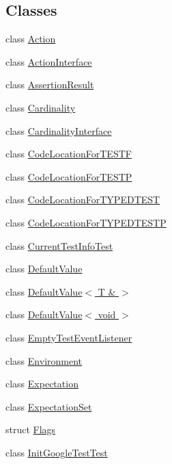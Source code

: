 \subsection*{Classes}
\begin{DoxyCompactItemize}
\item 
class \hyperlink{classtesting_1_1_action}{Action}
\item 
class \hyperlink{classtesting_1_1_action_interface}{Action\+Interface}
\item 
class \hyperlink{classtesting_1_1_assertion_result}{Assertion\+Result}
\item 
class \hyperlink{classtesting_1_1_cardinality}{Cardinality}
\item 
class \hyperlink{classtesting_1_1_cardinality_interface}{Cardinality\+Interface}
\item 
class \hyperlink{classtesting_1_1_code_location_for_t_e_s_t_f}{Code\+Location\+For\+T\+E\+S\+TF}
\item 
class \hyperlink{classtesting_1_1_code_location_for_t_e_s_t_p}{Code\+Location\+For\+T\+E\+S\+TP}
\item 
class \hyperlink{classtesting_1_1_code_location_for_t_y_p_e_d_t_e_s_t}{Code\+Location\+For\+T\+Y\+P\+E\+D\+T\+E\+ST}
\item 
class \hyperlink{classtesting_1_1_code_location_for_t_y_p_e_d_t_e_s_t_p}{Code\+Location\+For\+T\+Y\+P\+E\+D\+T\+E\+S\+TP}
\item 
class \hyperlink{classtesting_1_1_current_test_info_test}{Current\+Test\+Info\+Test}
\item 
class \hyperlink{classtesting_1_1_default_value}{Default\+Value}
\item 
class \hyperlink{classtesting_1_1_default_value_3_01_t_01_6_01_4}{Default\+Value$<$ T \& $>$}
\item 
class \hyperlink{classtesting_1_1_default_value_3_01void_01_4}{Default\+Value$<$ void $>$}
\item 
class \hyperlink{classtesting_1_1_empty_test_event_listener}{Empty\+Test\+Event\+Listener}
\item 
class \hyperlink{classtesting_1_1_environment}{Environment}
\item 
class \hyperlink{classtesting_1_1_expectation}{Expectation}
\item 
class \hyperlink{classtesting_1_1_expectation_set}{Expectation\+Set}
\item 
struct \hyperlink{structtesting_1_1_flags}{Flags}
\item 
class \hyperlink{classtesting_1_1_init_google_test_test}{Init\+Google\+Test\+Test}

\end{DoxyCompactItemize}
